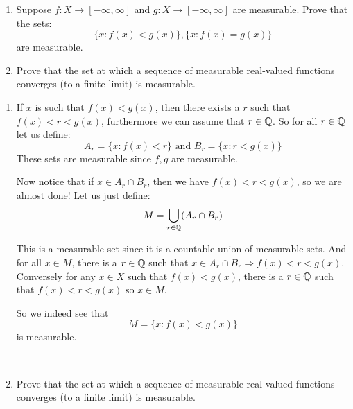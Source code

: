     \begin{exercise}
        \begin{enumerate}[label = (\alph*)]
            \item Suppose $f\colon X\rightarrow [-\infty,\infty]$ and $g\colon X\rightarrow [-\infty, \infty]$ are measurable. Prove that the sets:\[
                \{x\colon f(x)<g(x)\}, \{x\colon f(x) = g(x)\}    
            \] are measurable.
            \item Prove that the set at which a sequence of measurable real-valued functions converges (to a finite limit) is measurable.
        \end{enumerate}
        \begin{enumerate}[label = (\alph*)]
            \item If $x$ is such that $f(x)<g(x)$, then there exists a $r$ such that $f(x)<r<g(x)$, furthermore we can assume that $r\in \mathbb{Q}$. So for all $r\in \mathbb{Q}$ let us define:\begin{equation*}
                A_r = \{x\colon f(x)<r\} \text{ and } B_r = \{x\colon r<g(x)\}
            \end{equation*}
            These sets are measurable since $f,g$ are measurable.

            Now notice that if $x\in A_r\cap B_r$, then we have $f(x)<r<g(x)$, so we are almost done! Let us just define:\begin{equation*}
                M = \bigcup_{r\in \mathbb{Q}}(A_r\cap B_r)
            \end{equation*}

            This is a measurable set since it is a countable union of measurable sets. And for all $x\in M$, there is a $r\in \mathbb{Q}$ such that $x\in A_r\cap B_r \Rightarrow f(x)<r<g(x)$. Conversely for any $x\in X$ such that $f(x)<g(x)$, there is a $r\in \mathbb{Q}$ such that $f(x)<r<g(x)$ so $x\in M$.

            So we indeed see that \[M = \{x\colon f(x)<g(x)\}\] is measurable.

            \

            
            \item Prove that the set at which a sequence of measurable real-valued functions converges (to a finite limit) is measurable.
        \end{enumerate}
    \end{exercise}
 